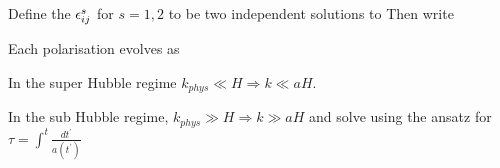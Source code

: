 \documentclass{article}
\begin{document}
\begin{definition}
Define the  $\epsilon_{ij}^s$ for $s=1,2$ to be two independent solutions to 
Then write 
\end{definition}

Each polarisation evolves as 

In the super Hubble regime $k_{phys} \ll H \Rightarrow k \ll aH$. 

In the sub Hubble regime, $k_{phys} \gg H \Rightarrow k \gg aH$ and solve using the ansatz 
for $\tau = \int^t \frac{dt^\prime}{a(t^\prime)}$

\end{document}
